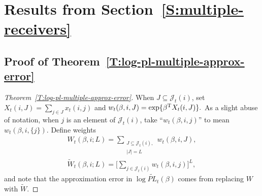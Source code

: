 \documentclass[final]{statsoc}
\begin{document}
\newcommand{\multiplereceiverssection}{\ref{S:multiple-receivers}}
\section{Results from Section~\protect\multiplereceiverssection{}}
\label{S:multiple-recipient-proofs}

\subsection{Proof of Theorem~\ref{T:log-pl-multiple-approx-error}}

\begin{proof}[Theorem~\ref{T:log-pl-multiple-approx-error}]

When $J \subseteq \mathcal{J}_t(i)$, set
\(
    X_t(i, J) = \sum_{j \in J} x_t(i,j)
\)
and
\(
    w_t(\beta, i, J)
        = \exp\{ \beta^{\mathrm{T}} X_t(i,J) \}.
\)
As a slight abuse of notation, when $j$ is an element of $\mathcal{J}_t(i)$,
take ``$w_t(\beta, i, j)$'' to mean $w_t(\beta, i, \{j\})$.  Define weights
\begin{subequations}
\begin{gather*}
    W_t(\beta, i; L)
        = \sum_{\substack{J \subseteq \mathcal{J}_t(i), \\
                          |J| = L}}
              w_t(\beta,i,J), \\
    \widetilde W_t(\beta, i; L)
        =
            \Big[ \sum_{j \in \mathcal{J}_t(i)} w_t(\beta, i, j) \Big]^L,
\end{gather*}
\end{subequations}
and note that the approximation error in
$\log \widetilde{\mathit{PL}}_t(\beta)$ comes from replacing
$W$ with $\widetilde W$.


\end{proof}
\end{document}
